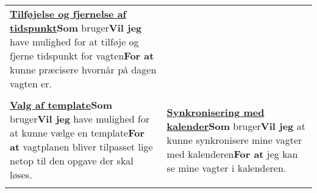 \begin{tabular}{p{2.5in}p{2.5in}}
\textbf{\underline{Tilføjelse og fjernelse af tidspunkt}}\newline \textbf{Som} bruger\newline \textbf{Vil jeg} have mulighed for at tilføje og fjerne tidspunkt for vagten\newline \textbf{For at} kunne præcisere hvornår på dagen vagten er.  \\\\

\textbf{\underline{Valg af template}}\newline \textbf{Som} bruger\newline \textbf{Vil jeg} have mulighed for at kunne vælge en template\newline \textbf{For at} vagtplanen bliver tilpasset lige netop til den opgave der skal løses.  & 

\textbf{\underline{Synkronisering med kalender}}\newline \textbf{Som} bruger\newline \textbf{Vil jeg} at kunne synkronisere mine vagter med kalenderen\newline \textbf{For at} jeg kan se mine vagter i kalenderen.  \\\\
\end{tabular}
